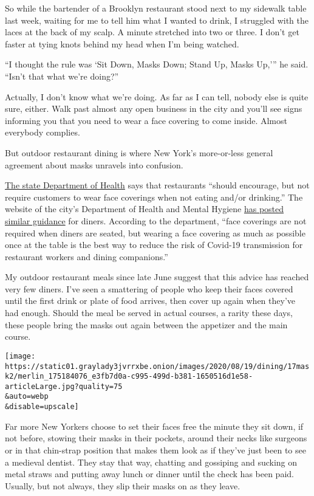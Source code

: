 So while the bartender of a Brooklyn restaurant stood next to my
sidewalk table last week, waiting for me to tell him what I wanted to
drink, I struggled with the laces at the back of my scalp. A minute
stretched into two or three. I don't get faster at tying knots behind my
head when I'm being watched.

``I thought the rule was `Sit Down, Masks Down; Stand Up, Masks Up,'''
he said. ``Isn't that what we're doing?''

Actually, I don't know what we're doing. As far as I can tell, nobody
else is quite sure, either. Walk past almost any open business in the
city and you'll see signs informing you that you need to wear a face
covering to come inside. Almost everybody complies.

But outdoor restaurant dining is where New York's more-or-less general
agreement about masks unravels into confusion.

\href{https://www.governor.ny.gov/sites/governor.ny.gov/files/atoms/files/OutdoorTakeoutDeliveryFoodServicesMasterGuidance.pdf}{The
state Department of Health} says that restaurants ``should encourage,
but not require customers to wear face coverings when not eating and/or
drinking.'' The website of the city's Department of Health and Mental
Hygiene
\href{https://www1.nyc.gov/assets/doh/downloads/pdf/imm/covid-19-dining-safely.pdf}{has
posted similar guidance} for diners. According to the department, ``face
coverings are not required when diners are seated, but wearing a face
covering as much as possible once at the table is the best way to reduce
the risk of Covid-19 transmission for restaurant workers and dining
companions.''

My outdoor restaurant meals since late June suggest that this advice has
reached very few diners. I've seen a smattering of people who keep their
faces covered until the first drink or plate of food arrives, then cover
up again when they've had enough. Should the meal be served in actual
courses, a rarity these days, these people bring the masks out again
between the appetizer and the main course.

\texttt{[image: https://static01.graylady3jvrrxbe.onion/images/2020/08/19/dining/17mask2/merlin\_175184076\_e3fb7d0a-c995-499d-b381-1650516d1e58-articleLarge.jpg?quality=75\\\&auto=webp\\\&disable=upscale]}

Far more New Yorkers choose to set their faces free the minute they sit
down, if not before, stowing their masks in their pockets, around their
necks like surgeons or in that chin-strap position that makes them look
as if they've just been to see a medieval dentist. They stay that way,
chatting and gossiping and sucking on metal straws and putting away
lunch or dinner until the check has been paid. Usually, but not always,
they slip their masks on as they leave.

